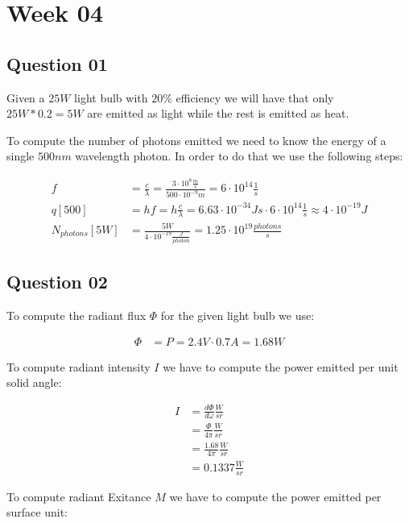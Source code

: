 \chapter{Week 04}

  \section{Question 01}

    Given a $25W$ light bulb with $20\%$ efficiency we will have that only
    $25W * 0.2 = 5W$ are emitted as light while the rest is emitted as
    heat.

    To compute the number of photons emitted we need to know the energy of
    a single $500nm$ wavelength photon. In order to do that we use the
    following steps:

    \begin{align}
      f &= \frac{c}{\lambda} = \frac{3 \cdot 10^8 \frac{m}{s}}{500 \cdot 10^{-9} m} = 6 \cdot 10^{14} \frac{1}{s} \\
      q[500] &= hf = h \frac{c}{\lambda} = 6.63 \cdot 10^{-34}Js \cdot 6 \cdot 10^{14} \frac{1}{s} \approx 4 \cdot 10^{-19}J \\
      N_{photons}[5W] &= \frac{5W}{4 \cdot 10^{-19}\frac{J}{photon}} = 1.25 \cdot 10^{19} \frac{photons}{s}
    \end{align}

  \section{Question 02}

    To compute the radiant flux $\Phi$ for the given light bulb we use:
    
    \begin{align}
      \Phi &= P = 2.4V \cdot 0.7A = 1.68W
    \end{align}

    To compute radiant intensity $I$ we have to compute the power emitted per unit solid angle:

    \begin{align}\label{eqn:radInt}
      I &= \frac{d\Phi}{d\omega}\frac{W}{sr} \\
        &= \frac{\Phi}{4\pi}\frac{W}{sr}  \\
        &= \frac{1.68}{4\pi}\frac{W}{sr}  \\
        &= 0.1337\frac{W}{sr}
    \end{align}

    To compute radiant Exitance $M$ we have to compute the power emitted per surface unit:

